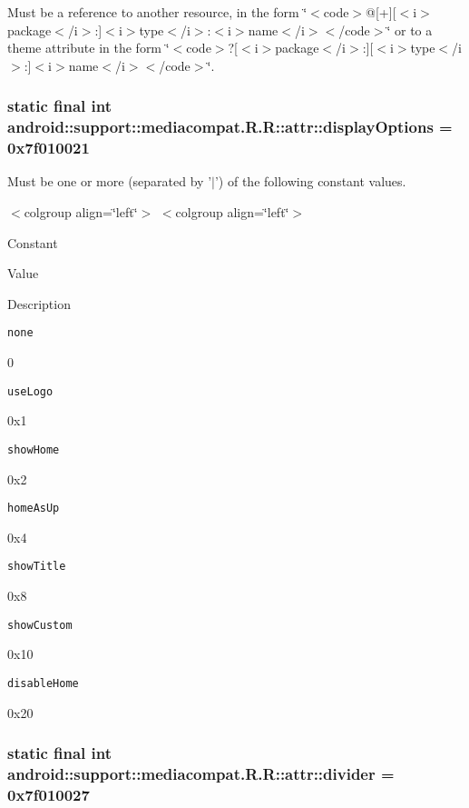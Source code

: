 Must be a reference to another resource, in the form \char`\"{}$<$code$>$@\mbox{[}+\mbox{]}\mbox{[}$<$i$>$package$<$/i$>$:\mbox{]}$<$i$>$type$<$/i$>$:$<$i$>$name$<$/i$>$$<$/code$>$\char`\"{} or to a theme attribute in the form \char`\"{}$<$code$>$?\mbox{[}$<$i$>$package$<$/i$>$:\mbox{]}\mbox{[}$<$i$>$type$<$/i$>$:\mbox{]}$<$i$>$name$<$/i$>$$<$/code$>$\char`\"{}. \hypertarget{classandroid_1_1support_1_1mediacompat_1_1_r_1_1attr_73f96b4a380d1744c7fe30d61167551c}{
\subsubsection[{displayOptions}]{\setlength{\rightskip}{0pt plus 5cm}static final int android::support::mediacompat.R.R::attr::displayOptions = 0x7f010021}}
\label{classandroid_1_1support_1_1mediacompat_1_1_r_1_1attr_73f96b4a380d1744c7fe30d61167551c}


Must be one or more (separated by '$|$') of the following constant values. \begin{TabularC}{0}
\hline
\end{TabularC}
$<$colgroup align=\char`\"{}left\char`\"{}$>$ $<$colgroup align=\char`\"{}left\char`\"{}$>$ 

Constant

Value

Description 

{\tt none}

0

{\tt useLogo}

0x1

{\tt showHome}

0x2

{\tt homeAsUp}

0x4

{\tt showTitle}

0x8

{\tt showCustom}

0x10

{\tt disableHome}

0x20\hypertarget{classandroid_1_1support_1_1mediacompat_1_1_r_1_1attr_2733cc3aa3348695aabab7c62befd9b8}{
\subsubsection[{divider}]{\setlength{\rightskip}{0pt plus 5cm}static final int android::support::mediacompat.R.R::attr::divider = 0x7f010027}}
\label{classandroid_1_1support_1_1mediacompat_1_1_r_1_1attr_2733cc3aa3348695aabab7c62befd9b8}


